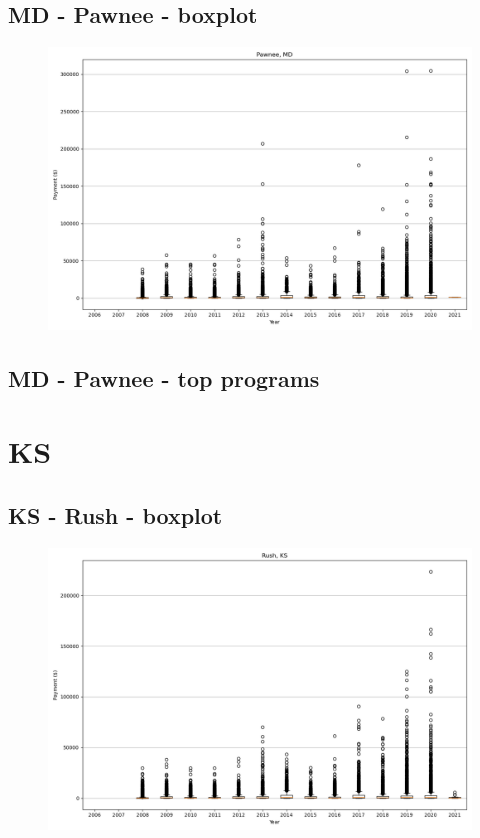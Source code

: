 \subsection*{MD - Pawnee - boxplot}
\begin{figure}[h]
\centering
\includegraphics[width=7in]{../output/boxplots/counties/Pawnee-MD_boxplot.png}
\end{figure}


\subsection*{MD - Pawnee - top programs}

\newpage
\section*{KS}
\subsection*{KS - Rush - boxplot}
\begin{figure}[h]
\centering
\includegraphics[width=7in]{../output/boxplots/counties/Rush-KS_boxplot.png}
\end{figure}



